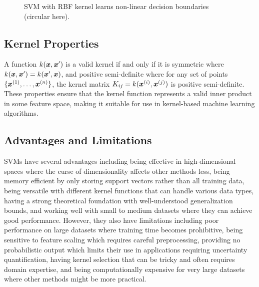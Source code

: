 \begin{figure}[htbp]
\centering
{}
\caption{SVM with RBF kernel learns non-linear decision boundaries (circular here).}
\label{fig:svm-rbf-kernel}
\end{figure}

\subsection{Kernel Properties}

A function $k(\boldsymbol{x}, \boldsymbol{x}')$ is a valid kernel if and only if it is symmetric where $k(\boldsymbol{x}, \boldsymbol{x}') = k(\boldsymbol{x}', \boldsymbol{x})$, and positive semi-definite where for any set of points $\{\boldsymbol{x}^{(1)}, \ldots, \boldsymbol{x}^{(n)}\}$, the kernel matrix $K_{ij} = k(\boldsymbol{x}^{(i)}, \boldsymbol{x}^{(j)})$ is positive semi-definite. These properties ensure that the kernel function represents a valid inner product in some feature space, making it suitable for use in kernel-based machine learning algorithms.

\subsection{Advantages and Limitations}

SVMs have several advantages including being effective in high-dimensional spaces where the curse of dimensionality affects other methods less, being memory efficient by only storing support vectors rather than all training data, being versatile with different kernel functions that can handle various data types, having a strong theoretical foundation with well-understood generalization bounds, and working well with small to medium datasets where they can achieve good performance. However, they also have limitations including poor performance on large datasets where training time becomes prohibitive, being sensitive to feature scaling which requires careful preprocessing, providing no probabilistic output which limits their use in applications requiring uncertainty quantification, having kernel selection that can be tricky and often requires domain expertise, and being computationally expensive for very large datasets where other methods might be more practical.

